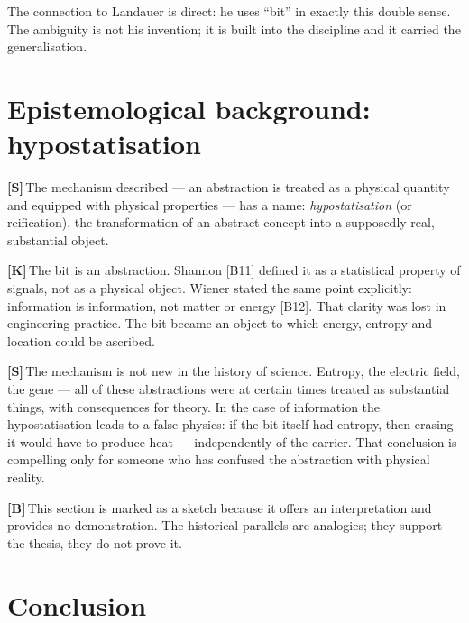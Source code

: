 \documentclass[11pt,a4paper]{article}
\newcommand{\LK}{\textcolor{layK}{\textbf{\footnotesize\textsf{[K]}}}\,}
\newcommand{\LB}{\textcolor{layB}{\textbf{\footnotesize\textsf{[B]}}}\,}
\newcommand{\LSk}{\textcolor{layS}{\textbf{\footnotesize\textsf{[S]}}}\,}
\theoremstyle{ffgft}
\begin{document}
The connection to Landauer is direct: he uses “bit” in exactly this double sense.
The ambiguity is not his invention; it is built into the discipline and it carried
the generalisation.

\section{Epistemological background: hypostatisation}

\LSk The mechanism described --- an abstraction is treated as a physical quantity
and equipped with physical properties --- has a name: \emph{hypostatisation} (or
reification), the transformation of an abstract concept into a supposedly real,
substantial object.

\LK The bit is an abstraction. Shannon [B11] defined it as a statistical property
of signals, not as a physical object. Wiener stated the same point explicitly:
information is information, not matter or energy [B12]. That clarity was lost in
engineering practice. The bit became an object to which energy, entropy and
location could be ascribed.

\LSk The mechanism is not new in the history of science. Entropy, the electric
field, the gene --- all of these abstractions were at certain times treated as
substantial things, with consequences for theory. In the case of information the
hypostatisation leads to a false physics: if the bit itself had entropy, then
erasing it would have to produce heat --- independently of the carrier. That
conclusion is compelling only for someone who has confused the abstraction with
physical reality.

\LB This section is marked as a sketch because it offers an interpretation and
provides no demonstration. The historical parallels are analogies; they support
the thesis, they do not prove it.

\section{Conclusion}
\end{document}
